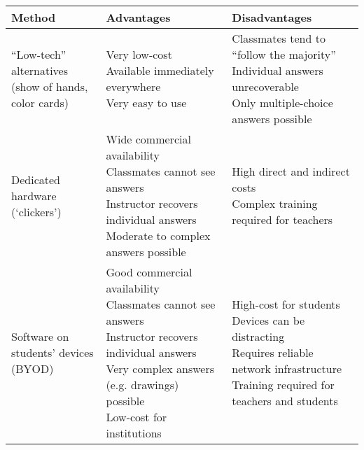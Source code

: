 \begin{table*}[t]
    \begin{center}
        \begin{tabular}{l l l}
            \hline
             Method &  Advantages &  Disadvantages\\
            \hline
            \makecell[l]{“Low-tech” alternatives\\(show of hands, color cards)}&
            \makecell[l]{
                Very low-cost\\
                Available immediately everywhere\\
                Very easy to use
            }&
            \makecell[l]{
                Classmates tend to “follow the majority”\\
                Individual answers unrecoverable\\
                Only multiple-choice answers possible
            }\\

            \hline
            \makecell[l]{Dedicated hardware\\(‘clickers’)}&
            \makecell[l]{
                Wide commercial availability\\
                Classmates cannot see answers\\
                Instructor recovers individual answers\\
                Moderate to complex answers possible
            }&
            \makecell[l]{
                High direct and indirect costs\\
                Complex training required for teachers
            }\\

            \hline
            \makecell[l]{Software on students' devices\\(BYOD)}&
            \makecell[l]{
                Good commercial availability\\
                Classmates cannot see answers\\
                Instructor recovers individual answers\\
                Very complex answers (e.g. drawings) possible\\
                Low-cost for institutions
            }&
            \makecell[l]{
                High-cost for students\\
                Devices can be distracting\\
                Requires reliable network infrastructure\\
                Training required for teachers and students
            }\\


\end{tabular}
\end{center}
\end{table*}
